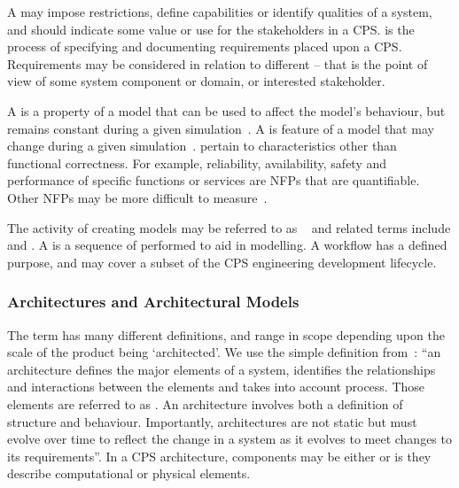 A  may impose restrictions, define capabilities or identify qualities of a system, and should indicate some value or use for the stakeholders in a CPS.  is the process of specifying and documenting requirements placed upon a CPS. Requirements may be considered in relation to different  -- that is the point of view of some system component or domain, or interested stakeholder.

A  is a property of a model that can be used to affect the model's behaviour, but remains constant during a given simulation~\cite{Broenink&12b}. A  is feature of a model that may change during a given simulation~\cite{Broenink&12b}.  pertain to characteristics other than functional correctness. For example, reliability, availability, safety and performance of specific functions or services are NFPs that are quantifiable. Other NFPs may be more difficult to measure~\cite{Payne&10}.

The activity of creating models may be referred to as  ~\cite{Fitzgerald&14c} and related terms include  and . A  is a sequence of  performed to aid in modelling. A workflow has a defined purpose, and may cover a subset of the CPS engineering development lifecycle.

\subsubsection{Architectures and Architectural Models}
\label{sec:concepts:arch}
The term  has many different definitions, and range in scope depending upon the scale of the product being `architected'. We use the simple definition from~\cite{COMPASSD22.6}:  ``an architecture defines the major elements of a system, identifies the relationships and interactions between the elements and takes into account process. Those elements are referred to as . An architecture involves both a definition of structure and behaviour. Importantly, architectures are not static but must evolve over time to reflect the change in a system as it evolves to meet changes to its requirements''. In a CPS architecture, components may be either  or  is they describe computational or physical elements.

